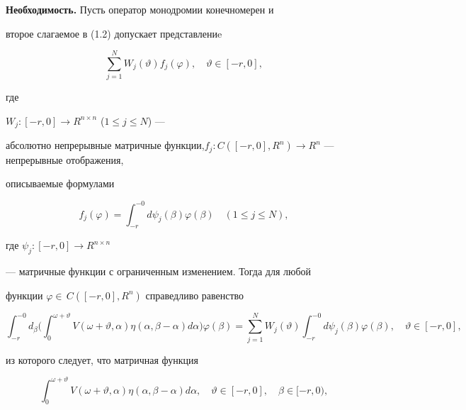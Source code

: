\begin{pf}


{\bf Необходимость.} Пусть оператор монодромии конечномерен и


второе слагаемое в (1.2) допускает представлениe


$$


\sum_{j=1}^{N}


W_{j}(\vartheta) f_{j}(\varphi),  \quad \vartheta \in[-r,0],


$$


где


$W_{j} : [-r,0] \rightarrow R^{n \times n}$ ($1 \leq j \leq N$) ---


абсолютно непрерывные матричные функции,\linebreak $f_{j} : C([-r,0],R^{n})


\rightarrow R^{n}$ --- непрерывные отображения,


описываемые формулами


$$


f_{j}(\varphi) = \int_{-r}^{-0}d


\psi_{j}(\beta) \varphi(\beta) \quad (1 \leq j \leq N),


$$


где $\psi_{j} : [-r,0] \rightarrow R^{n \times n}$


--- матричные функции с ограниченным изменением. Тогда для любой


функции $ \varphi \in \,C([-r,0],R^{n})$ справедливо равенство


$$


\int_{-r}^{-0} d_{\beta}\bigg(\int_{0}^{\omega+ \vartheta} V(\omega+


\vartheta, \alpha) \eta(\alpha, \beta- \alpha) d \alpha\bigg)


\varphi(\beta) = \sum_{j=1}^{N} W_{j}(\vartheta)


\int_{-r}^{-0} d \psi_{j}(\beta) \varphi(\beta),  \quad \vartheta


\in[-r,0],


$$


из которого следует, что матричная функция


\begin{equation}


\int_{0}^{\omega+ \vartheta}V(\omega+ \vartheta, \alpha)


\eta(\alpha, \beta- \alpha) d \alpha,  \quad \vartheta \in[-r,0],


\quad \beta \in[-r,0),


\end{equation}



\end{pf}
